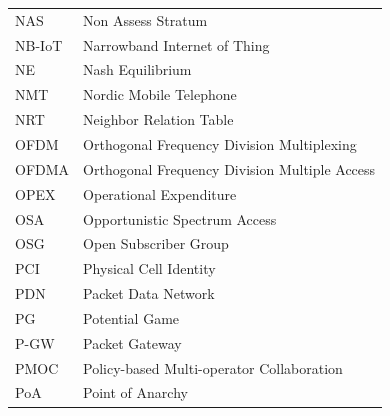 \begin{tabular}{ll}
NAS & Non Assess Stratum\\
NB-IoT & Narrowband Internet of Thing\\ 
NE & Nash Equilibrium\\
NMT & Nordic Mobile Telephone\\
NRT & Neighbor Relation Table\\

OFDM & Orthogonal Frequency Division Multiplexing\\
OFDMA & Orthogonal Frequency Division Multiple Access\\
OPEX & Operational Expenditure\\
OSA & Opportunistic Spectrum Access\\
OSG & Open Subscriber Group\\

PCI & Physical Cell Identity\\
PDN & Packet Data Network\\
PG & Potential Game\\
P-GW & Packet Gateway\\
%
%
PMOC & Policy-based Multi-operator Collaboration\\
PoA & Point of Anarchy\\


\end{tabular}
